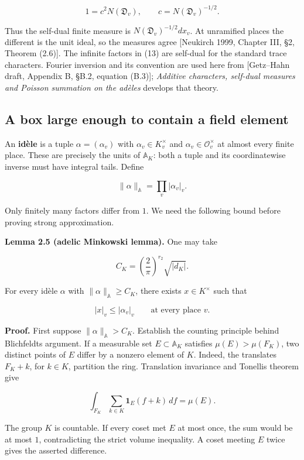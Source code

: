 \documentclass[
  english,
  11pt,
  a4paper,
]{article}
\begin{document}
\[1=c^2N(\mathfrak D_v),\qquad
c=N(\mathfrak D_v)^{-1/2}.\]

Thus the self-dual finite measure is \(N(\mathfrak D_v)^{-1/2}dx_v\). At
unramified places the different is the unit ideal, so the measures agree
{[}Neukirch 1999, Chapter III, §2, Theorem (2.6){]}. The infinite
factors in (13) are self-dual for the standard trace characters. Fourier
inversion and its convention are used here from {[}Getz--Hahn draft,
Appendix B, §B.2, equation (B.3){]}; \emph{Additive characters,
self-dual measures and Poisson summation on the adèles} develops that
theory.

\subsection{A box large enough to contain a field
element}\label{NT-ADL-02--a-box-large-enough-to-contain-a-field-element}

An \textbf{idèle} is a tuple \(\alpha=(\alpha_v)\) with
\(\alpha_v\in K_v^\times\) and \(\alpha_v\in\mathcal O_v^\times\) at
almost every finite place. These are precisely the units of
\(\mathbb A_K\): both a tuple and its coordinatewise inverse must have
integral tails. Define

\[\|\alpha\|_{\mathbb A}=\prod_v|\alpha_v|_v.\]

Only finitely many factors differ from \(1\). We need the following
bound before proving strong approximation.

\textbf{Lemma 2.5 (adelic Minkowski lemma).} One may take

\[C_K=\left(\frac2\pi\right)^{r_2}\sqrt{|d_K|}.
\tag{16}\]

For every idèle \(\alpha\) with \(\|\alpha\|_{\mathbb A}\geq C_K\),
there exists \(x\in K^\times\) such that

\[|x|_v\leq|\alpha_v|_v\qquad\text{at every place }v.
\tag{17}\]

\textbf{Proof.} First suppose \(\|\alpha\|_{\mathbb A}>C_K\). Establish
the counting principle behind Blichfeldt\textquotesingle s argument. If
a measurable set \(E\subset\mathbb A_K\) satisfies \(\mu(E)>\mu(F_K)\),
two distinct points of \(E\) differ by a nonzero element of \(K\).
Indeed, the translates \(F_K+k\), for \(k\in K\), partition the ring.
Translation invariance and Tonelli\textquotesingle s theorem give

\[\int_{F_K}\sum_{k\in K}\mathbf1_E(f+k)\,df=\mu(E).
\tag{18}\]

The group \(K\) is countable. If every coset met \(E\) at most once, the
sum would be at most \(1\), contradicting the strict volume inequality.
A coset meeting \(E\) twice gives the asserted difference.
\end{document}
